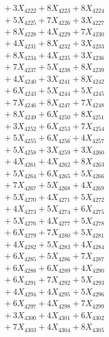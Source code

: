 \documentclass[a4paper,10pt]{article}
\begin{document}
{\begin{align}
&\;  + 3 X_{4222} + 8 X_{4223} + 8 X_{4224} \\[0.3ex]
&\;  + 5 X_{4225} + 7 X_{4226} + 3 X_{4227} \\[0.3ex]
&\;  + 8 X_{4228} + 4 X_{4229} + 7 X_{4230} \\[0.3ex]
&\;  + 4 X_{4231} + 8 X_{4232} + 3 X_{4233} \\[0.3ex]
&\;  + 8 X_{4234} + 4 X_{4235} + 3 X_{4236} \\[0.3ex]
&\;  + 7 X_{4237} + 5 X_{4238} + 8 X_{4239} \\[0.5ex]\allowbreak
&\;  + 4 X_{4240} + 3 X_{4241} + 8 X_{4242} \\[0.3ex]
&\;  + 6 X_{4243} + 5 X_{4244} + 5 X_{4245} \\[0.3ex]
&\;  + 7 X_{4246} + 8 X_{4247} + 7 X_{4248} \\[0.3ex]
&\;  + 8 X_{4249} + 6 X_{4250} + 8 X_{4251} \\[0.3ex]
&\;  + 3 X_{4252} + 6 X_{4253} + 7 X_{4254} \\[0.3ex]
&\;  + 5 X_{4255} + 6 X_{4256} + 4 X_{4257} \\[0.3ex]
&\;  + 5 X_{4258} + 3 X_{4259} + 3 X_{4260} \\[0.3ex]
&\;  + 4 X_{4261} + 4 X_{4262} + 8 X_{4263} \\[0.3ex]
&\;  + 5 X_{4264} + 6 X_{4265} + 5 X_{4266} \\[0.3ex]
&\;  + 7 X_{4267} + 5 X_{4268} + 4 X_{4269} \\[0.5ex]\allowbreak
&\;  + 5 X_{4270} + 4 X_{4271} + 5 X_{4272} \\[0.3ex]
&\;  + 4 X_{4273} + 5 X_{4274} + 6 X_{4275} \\[0.3ex]
&\;  + 5 X_{4276} + 4 X_{4277} + 5 X_{4278} \\[0.3ex]
&\;  + 6 X_{4279} + 7 X_{4280} + 5 X_{4281} \\[0.3ex]
&\;  + 4 X_{4282} + 5 X_{4283} + 4 X_{4284} \\[0.3ex]
&\;  + 6 X_{4285} + 5 X_{4286} + 7 X_{4287} \\[0.3ex]
&\;  + 6 X_{4288} + 6 X_{4289} + 4 X_{4290} \\[0.3ex]
&\;  + 6 X_{4291} + 7 X_{4292} + 5 X_{4293} \\[0.3ex]
&\;  + 4 X_{4294} + 4 X_{4295} + 5 X_{4296} \\[0.3ex]
&\;  + 6 X_{4297} + 4 X_{4298} + 7 X_{4299} \\[0.5ex]\allowbreak
&\;  + 3 X_{4300} + 4 X_{4301} + 6 X_{4302} \\[0.3ex]
&\;  + 7 X_{4303} + 4 X_{4304} + 8 X_{4305} \\[0.3ex]

\end{align}}
\end{document}
